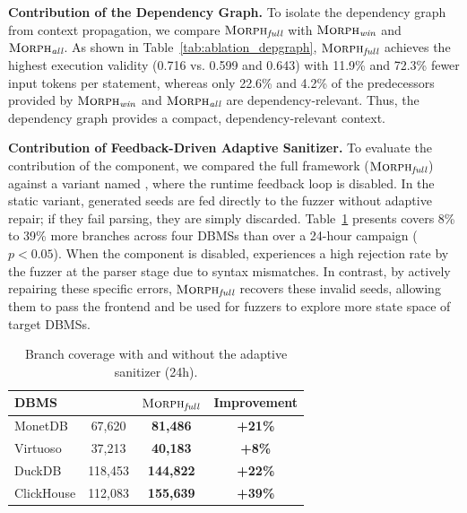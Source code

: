 \documentclass[conference]{IEEEtran}
\begin{document}
\textbf{Contribution of the Dependency Graph.}
To isolate the dependency graph from context propagation, we compare $\textsc{Morph}{}_{\textit{full}}$ with $\textsc{Morph}{}_{\textit{win}}$ and $\textsc{Morph}{}_{\textit{all}}$.
As shown in Table~\ref{tab:ablation_depgraph}, $\textsc{Morph}{}_{\textit{full}}$ achieves the highest execution validity (0.716 vs. 0.599 and 0.643) with 11.9\% and 72.3\% fewer input tokens per statement, whereas only 22.6\% and 4.2\% of the predecessors provided by $\textsc{Morph}{}_{\textit{win}}$ and $\textsc{Morph}{}_{\textit{all}}$ are dependency-relevant.
Thus, the dependency graph provides a compact, dependency-relevant context.




\textbf{Contribution of Feedback-Driven Adaptive Sanitizer.}
To evaluate the contribution of the component, we compared the full framework ($\textsc{Morph}{}_{\textit{full}}$) against a variant named \tooldisfuzzer{}, where the runtime feedback loop is disabled. In the static variant, generated seeds are fed directly to the fuzzer without adaptive repair; if they fail parsing, they are simply discarded.
Table~\ref{tab:ablation_sanitizer} presents \tool{} covers 8\% to 39\% more branches across four DBMSs than \tooldisfuzzer{} over a 24-hour campaign ($p<0.05$).
When the component is disabled, \tooldisfuzzer{} experiences a high rejection rate by the fuzzer at the parser stage due to syntax mismatches.
In contrast, by actively repairing these specific errors, $\textsc{Morph}{}_{\textit{full}}$ recovers these invalid seeds, allowing them to pass the frontend and be used for fuzzers to explore more state space of target DBMSs.

\begin{table}[!h]
\centering
\footnotesize
\caption{Branch coverage with and without the adaptive sanitizer (24h).}
\label{tab:ablation_sanitizer}
\setlength{\tabcolsep}{3pt}
\begin{tabular*}{\columnwidth}{@{\extracolsep{\fill}}lccc@{}}
\toprule
\textbf{DBMS} & \tooldisfuzzer{} & $\textsc{Morph}{}_{\textit{full}}$ & \textbf{Improvement} \\
\midrule
MonetDB    & 67,620 & \textbf{81,486}  & \textbf{+21\%} \\
Virtuoso   & 37,213 & \textbf{40,183}  & \textbf{+8\%} \\
DuckDB     & 118,453 & \textbf{144,822} & \textbf{+22\%} \\
ClickHouse & 112,083 & \textbf{155,639} & \textbf{+39\%} \\
\bottomrule
\end{tabular*}
\end{table}
\end{document}
